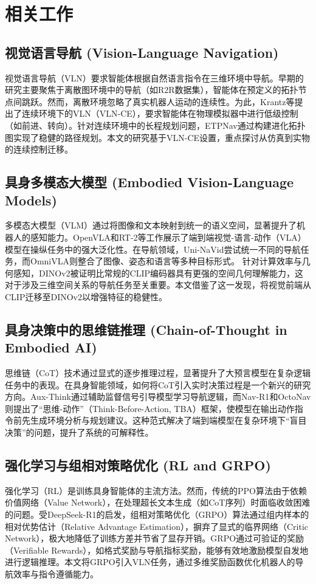 \cleardoublepage

\section{相关工作}

\subsection{视觉语言导航 (Vision-Language Navigation)}
视觉语言导航（VLN）要求智能体根据自然语言指令在三维环境中导航。早期的研究主要聚焦于离散图环境中的导航（如R2R数据集\cite{anderson2018vision}），智能体在预定义的拓扑节点间跳跃。然而，离散环境忽略了真实机器人运动的连续性。为此，Krantz等提出了连续环境下的VLN（VLN-CE\cite{krantz2020beyond}），要求智能体在物理模拟器中进行低级控制（如前进、转向）。针对连续环境中的长程规划问题，ETPNav\cite{etpnav}通过构建进化拓扑图实现了稳健的路径规划。本文的研究基于VLN-CE设置，重点探讨从仿真到实物的连续控制迁移。

\subsection{具身多模态大模型 (Embodied Vision-Language Models)}
多模态大模型（VLM）通过将图像和文本映射到统一的语义空间，显著提升了机器人的感知能力。OpenVLA\cite{kim2024openvla}和RT-2\cite{brohan2023rt2}等工作展示了端到端视觉-语言-动作（VLA）模型在操纵任务中的强大泛化性。在导航领域，Uni-NaVid\cite{uni_navid}尝试统一不同的导航任务，而OmniVLA\cite{omnivla}则整合了图像、姿态和语言等多种目标形式。
针对计算效率与几何感知，DINOv2\cite{dinov2_analysis}被证明比常规的CLIP\cite{radford2021learning}编码器具有更强的空间几何理解能力，这对于涉及三维空间关系的导航任务至关重要。本文借鉴了这一发现，将视觉前端从CLIP迁移至DINOv2以增强特征的稳健性。

\subsection{具身决策中的思维链推理 (Chain-of-Thought in Embodied AI)}
思维链（CoT\cite{wei2022chain}）技术通过显式的逐步推理过程，显著提升了大预言模型在复杂逻辑任务中的表现。在具身智能领域，如何将CoT引入实时决策过程是一个新兴的研究方向。Aux-Think\cite{aux_think}通过辅助监督信号引导模型学习导航逻辑，而Nav-R1\cite{nav_r1}和OctoNav\cite{octonav}则提出了“思维-动作”（Think-Before-Action, TBA）框架，使模型在输出动作指令前先生成环境分析与规划建议。这种范式解决了端到端模型在复杂环境下“盲目决策”的问题，提升了系统的可解释性。

\subsection{强化学习与组相对策略优化 (RL and GRPO)}
强化学习（RL）是训练具身智能体的主流方法。然而，传统的PPO算法由于依赖价值网络（Value Network），在处理超长文本生成（如CoT序列）时面临收敛困难的问题。受DeepSeek-R1\cite{deepseek_r1}的启发，组相对策略优化（GRPO）算法通过组内样本的相对优势估计（Relative Advantage Estimation），摒弃了显式的临界网络（Critic Network），极大地降低了训练方差并节省了显存开销。GRPO通过可验证的奖励（Verifiable Rewards\cite{verifiable_rewards}），如格式奖励与导航指标奖励，能够有效地激励模型自发地进行逻辑推理。本文将GRPO引入VLN任务，通过多维奖励函数优化机器人的导航效率与指令遵循能力。
